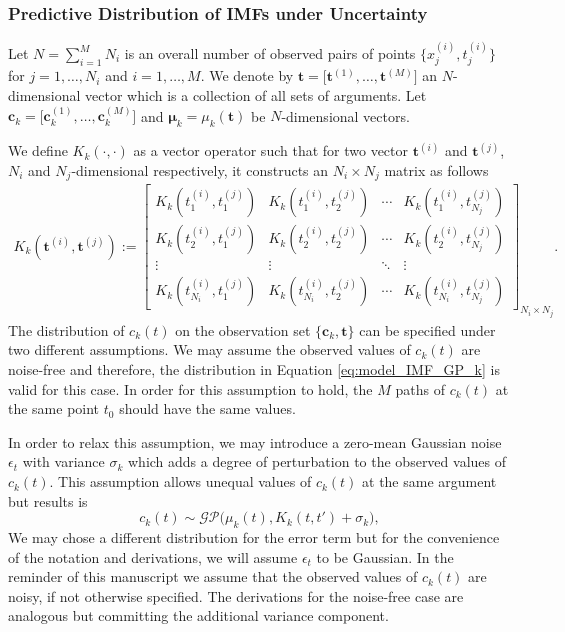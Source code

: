 \subsubsection{Predictive Distribution of IMFs  under Uncertainty}
Let $N = \sum_{i=1}^M N_i$ is an overall number of  observed pairs of points $\big\{x_j^{(i)}, t^{(i)}_j \big\}$  for $j = 1,\dots,N_i$ and $i = 1,\ldots	, M$. We denote by $\mathbf{t} = \big[ \mathbf{t}^{(1)} ,\ldots,\mathbf{t}^{(M)} \big]$ an $N$-dimensional vector which is a collection of all sets of arguments. Let $\mathbf{c}_k  = \big[ \mathbf{c}_k^{(1)} ,\ldots,\mathbf{c}_k^{(M)} \big]$ and $\bm{\mu}_k = \mu_k(\mathbf{t})$  be  $N$-dimensional vectors. 

We define $K_k( \cdot, \cdot)$ as a vector operator such that for two vector $\mathbf{t}^{(i)}$ and $\mathbf{t}^{(j)}$,  $N_i$ and $N_j$-dimensional respectively, it constructs an $N_i\times N_j$ matrix as follows
\begin{align*}
K_k (\mathbf{t}^{(i)},\mathbf{t}^{(j)}  ) := \begin{bmatrix}
K_k(t_1^{(i)},t_1^{(j)}) & K_k(t_1^{(i)},t_2^{(j)})& \cdots & K_k(t_1^{(i)},t_{N_j}^{(j)}) \\
K_k(t_2^{(i)},t_1^{(j)}) & K_k(t_2^{(i)},t_2^{(j)})& \cdots & K_k(t_2^{(i)},t_{N_j}^{(j)}) \\
\vdots & \vdots & \ddots & \vdots  \\
K_k(t_{N_i}^{(i)},t_1^{(j)}) & K_k(t_{N_i}^{(i)},t_2^{(j)})& \cdots & K_k(t_{N_i}^{(i)},t_{N_j}^{(j)}) 
\end{bmatrix}_{ N_i \times	N_j}. 
\end{align*}
The distribution of $c_k(t)$ on the observation set $\big\{ \mathbf{c}_k, \mathbf{t} \big\}$ can be specified under two different assumptions.  We may assume  the observed values of $c_k(t)$ are noise-free and therefore, the distribution in Equation \eqref{eq:model_IMF_GP_k} is valid for this case. In order for this assumption to hold, the $M$ paths of $c_k(t)$ at the same point $t_0$ should have the same values. 

In order to relax this assumption, we may introduce a zero-mean Gaussian noise $\epsilon_t$ with variance $\sigma_k$ which adds  a degree of perturbation to the observed values of $c_k(t)$. This assumption allows unequal values of $c_k(t)$ at the same argument but results is  
\begin{equation}\label{eq:model_IMF_GP_k_noisy}
c_k(t) \sim \mathcal{GP} \Big( \mu_k(t), K_k(t,t')+ \sigma_k\Big), 
\end{equation}
We may chose a different distribution for the error term but for the convenience of the notation and derivations, we will assume $\epsilon_t$ to be Gaussian.  In the reminder of this manuscript we assume that the observed values of $c_k(t)$ are noisy, if not otherwise specified. The derivations for the noise-free case are analogous but committing the additional variance component.


